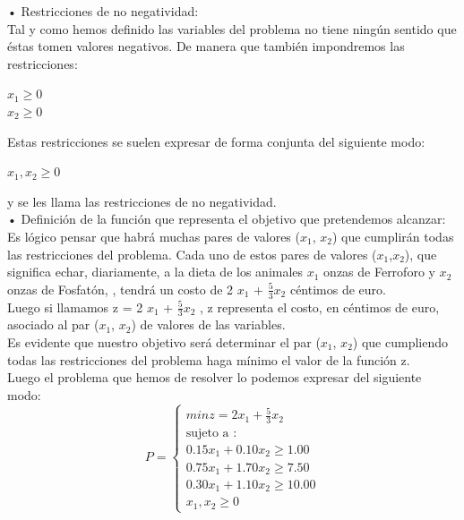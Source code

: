 \documentclass[a4,12pt]{article}
\begin{document}
• Restricciones de no negatividad:\\
Tal y como hemos definido las variables del problema no tiene ningún sentido que éstas tomen valores negativos. De manera que también impondremos las restricciones:\\

\begin{center}
         $x_1\ge 0$ \\
         $x_2\ge 0$ \\
\end{center}

Estas restricciones se suelen expresar de forma conjunta del siguiente modo:\\

\begin{center}
         $x_1 , x_2 \ge 0$\\
\end{center}

y se les llama las restricciones de no negatividad.\\

• Definición de la función que representa el objetivo que pretendemos alcanzar:\\
Es lógico pensar que habrá muchas pares de valores ($x_1$, $x_2$) que cumplirán todas las restricciones del problema. Cada uno de estos pares de valores ($x_1$,$x_2$), que significa echar, diariamente, a la dieta de los animales $x_1$ onzas de Ferroforo y $x_2$ onzas de Fosfatón, , tendrá un costo de 2 $x_1$ + $\frac{5}{3}x_2$  céntimos de euro.\\

Luego si llamamos z = 2 $x_1$ + $\frac{5}{3}x_2$  , z representa el costo, en céntimos de euro, asociado al par ($x_1$, $x_2$) de valores de las variables.\\

Es evidente que nuestro objetivo será determinar el par ($x_1$, $x_2$) que cumpliendo todas las restricciones del problema haga mínimo el valor de la función z.\\

Luego el problema que hemos de resolver lo podemos expresar del siguiente modo:\\

\begin{displaymath}
P = \left\{ \begin{array}{ll}
 min z=2x_{1}+\frac{5}{3}x_{2}\\
\text{sujeto a :}\\
   0.15x_{1}+0.10x_{2}  \geq 1.00\\
   0.75x_{1}+1.70x_{2}  \geq 7.50\\
   0.30x_{1}+1.10x_{2}  \geq  10.00\\
       x_{1} , x_{2}  \geq  0
\end{array}
\right.
\end{displaymath}
\end{document}
